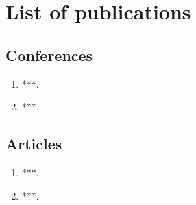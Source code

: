  \chapter{List of publications}\label{AppendixC}

 \section{Conferences}

 \begin{enumerate}
 \item ***.
 \item ***.
 \end{enumerate}

 \section{Articles}

 \begin{enumerate}
 \item ***.
 \item ***.
 \end{enumerate} 